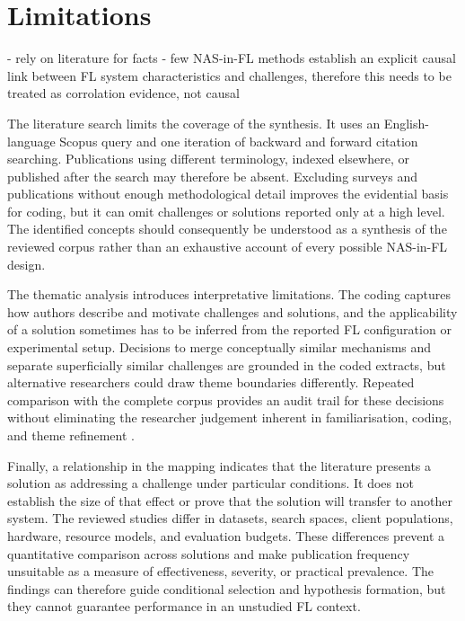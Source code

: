 \section{Limitations}

- rely on literature for facts
- few NAS-in-FL methods establish an explicit causal link between FL system characteristics and challenges, therefore this needs to be treated as corrolation evidence, not causal

The literature search limits the coverage of the synthesis. It uses an English-language Scopus query and one iteration of backward and forward citation searching. Publications using different terminology, indexed elsewhere, or published after the search may therefore be absent. Excluding surveys and publications without enough methodological detail improves the evidential basis for coding, but it can omit challenges or solutions reported only at a high level. The identified concepts should consequently be understood as a synthesis of the reviewed corpus rather than an exhaustive account of every possible NAS-in-FL design.

The thematic analysis introduces interpretative limitations. The coding captures how authors describe and motivate challenges and solutions, and the applicability of a solution sometimes has to be inferred from the reported FL configuration or experimental setup. Decisions to merge conceptually similar mechanisms and separate superficially similar challenges are grounded in the coded extracts, but alternative researchers could draw theme boundaries differently. Repeated comparison with the complete corpus provides an audit trail for these decisions without eliminating the researcher judgement inherent in familiarisation, coding, and theme refinement \cite{using_thematic_analysis_2006}.

Finally, a relationship in the mapping indicates that the literature presents a solution as addressing a challenge under particular conditions. It does not establish the size of that effect or prove that the solution will transfer to another system. The reviewed studies differ in datasets, search spaces, client populations, hardware, resource models, and evaluation budgets. These differences prevent a quantitative comparison across solutions and make publication frequency unsuitable as a measure of effectiveness, severity, or practical prevalence. The findings can therefore guide conditional selection and hypothesis formation, but they cannot guarantee performance in an unstudied FL context.

